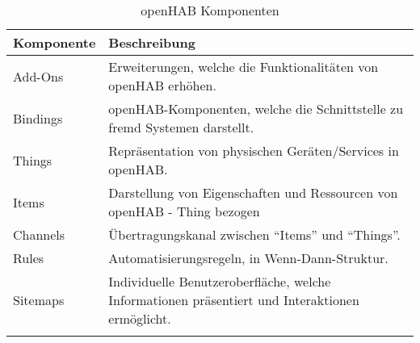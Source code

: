 \begin{longtable}{| p{4cm} | p{11cm}|}
	\hline
	\textbf{Komponente} & \textbf{Beschreibung} \\
	\hline \hline
	\centering Add-Ons & Erweiterungen, welche die Funktionalitäten von openHAB erhöhen. \\
	\hline
	\centering Bindings & openHAB-Komponenten, welche die Schnittstelle zu fremd Systemen darstellt.  \\
	\hline
	\centering Things & Repräsentation von physischen Geräten/Services in openHAB. \\
	\hline
	\centering Items & Darstellung von Eigenschaften und Ressourcen von openHAB - Thing bezogen \\
	\hline
	\centering Channels & Übertragungskanal zwischen "`Items"' und "`Things"'. \\
	\hline
	\centering Rules & Automatisierungsregeln, in Wenn-Dann-Struktur.\\
	\hline
	\centering Sitemaps & Individuelle Benutzeroberfläche, welche Informationen präsentiert und Interaktionen ermöglicht.\\
	\hline
	\caption{openHAB Komponenten}
	\label{table:openhub-components}
\end{longtable}

